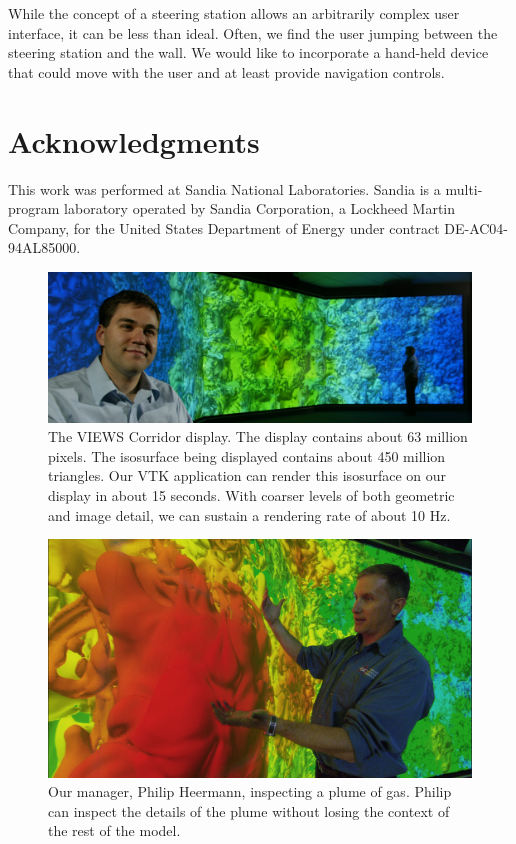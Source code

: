 \documentclass{acmsiggraph}
\newcommand{\sticky}[1]{}
\begin{document}
  While the concept of a steering station allows an arbitrarily complex
  user interface, it can be less than ideal.  Often, we find the user
  jumping between the steering station and the wall.  We would like to
  incorporate a hand-held device that could move with the user and at least
  provide navigation controls.


  \section{Acknowledgments}

  This work was performed at Sandia National Laboratories.  Sandia is a
  multi-program laboratory operated by Sandia Corporation, a Lockheed
  Martin Company, for the United States Department of Energy under contract
  DE-AC04-94AL85000.


  
  

  \begin{figure}[!p]
    \includegraphics[width=\textwidth]{images/FullWall}
    \caption{The VIEWS Corridor display.  The display contains about 63
    million pixels.  The isosurface being displayed contains about 450
    million triangles.  Our VTK application can render this isosurface on
    our display in about 15 seconds.  With coarser levels of both geometric
    and image detail, we can sustain a rendering rate of about 10 Hz.
    \sticky{Might want to verify that.}}
    \label{fig:fullwall}
  \end{figure}

  \begin{figure}[!p]
    \includegraphics[width=\textwidth]{images/PhilwBlob}
    \caption{Our manager, Philip Heermann, inspecting a plume of gas.
    Philip can inspect the details of the plume without losing the context
    of the rest of the model.}
    \label{fig:philwblob}
  \end{figure}
\end{document}
